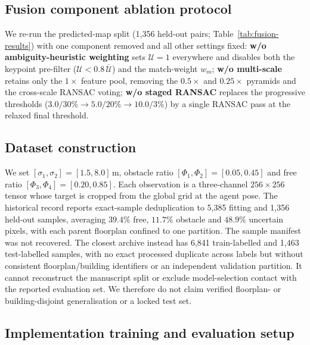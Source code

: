 \documentclass[11pt]{article}
\begin{document}
\subsection{Fusion component ablation protocol} \label{app:fusion-ablation}
We re-run the predicted-map split (1{,}356 held-out pairs; Table~\ref{tab:fusion-results}) with one component removed and all other settings fixed:
\textbf{w/o ambiguity-heuristic weighting} sets $\mathcal{U}{=}1$ everywhere and disables both the keypoint pre-filter ($\mathcal{U}{<}0.8\,\overline{\mathcal{U}}$) and the match-weight $w_m$;
\textbf{w/o multi-scale} retains only the $1\times$ feature pool, removing the $0.5\times$ and $0.25\times$ pyramids and the cross-scale RANSAC voting;
\textbf{w/o staged RANSAC} replaces the progressive thresholds ($3.0/30\%{\to}5.0/20\%{\to}10.0/3\%$) by a single RANSAC pass at the relaxed final threshold.

\subsection{Dataset construction} \label{app:dataset}

We set $[\sigma_1,\sigma_2]=[1.5,8.0]$\,m, obstacle ratio $[\Phi_1,\Phi_2]=[0.05,0.45]$ and free ratio $[\Phi_3,\Phi_4]=[0.20,0.85]$. Each observation is a three-channel $256{\times}256$ tensor whose target is cropped from the global grid at the agent pose. The historical record reports exact-sample deduplication to 5{,}385 fitting and 1{,}356 held-out samples, averaging $39.4\%$ free, $11.7\%$ obstacle and $48.9\%$ uncertain pixels, with each parent floorplan confined to one partition. The sample manifest was not recovered. The closest archive instead has 6{,}841 train-labelled and 1{,}463 test-labelled samples, with no exact processed duplicate across labels but without consistent floorplan/building identifiers or an independent validation partition. It cannot reconstruct the manuscript split or exclude model-selection contact with the reported evaluation set. We therefore do not claim verified floorplan- or building-disjoint generalisation or a locked test set.

\subsection{Implementation training and evaluation setup} \label{app:training}
\end{document}
